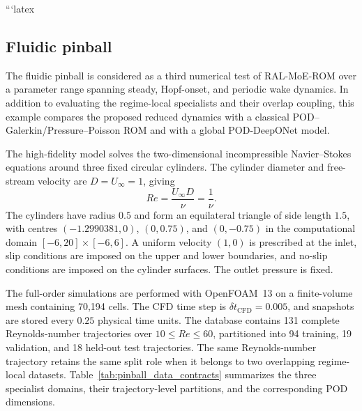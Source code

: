 
```latex
\subsection{Fluidic pinball}
\label{subsec:fluidic_pinball}

The fluidic pinball is considered as a third numerical test of RAL-MoE-ROM
over a parameter range spanning steady, Hopf-onset, and periodic wake
dynamics. In addition to evaluating the regime-local specialists and their
overlap coupling, this example compares the proposed reduced dynamics with a
classical POD--Galerkin/Pressure--Poisson ROM\cite{holmes1996turbulence} and with a global
POD-DeepONet model\cite{lu2021learning}. 

The high-fidelity model solves the two-dimensional incompressible
Navier--Stokes equations around three fixed circular cylinders. The cylinder
diameter and free-stream velocity are $D=U_\infty=1$, giving
\[
Re=\frac{U_\infty D}{\nu}=\frac{1}{\nu}.
\]
The cylinders have radius $0.5$ and form an equilateral triangle of side
length $1.5$, with centres
$(-1.2990381,0)$, $(0,0.75)$, and $(0,-0.75)$ in the computational domain
$[-6,20]\times[-6,6]$. A uniform velocity $(1,0)$ is prescribed at the
inlet, slip conditions are imposed on the upper and lower boundaries, and
no-slip conditions are imposed on the cylinder surfaces. The outlet
pressure is fixed.

The full-order simulations are performed with OpenFOAM~13 on a
finite-volume mesh containing 70,194 cells. The CFD time step is
$\delta t_{\mathrm{CFD}}=0.005$, and snapshots are stored every $0.25$
physical time units. The database contains 131 complete Reynolds-number trajectories over
$10\le Re\le60$, partitioned into 94 training, 19 validation, and 18
held-out test trajectories. The same Reynolds-number trajectory retains the
same split role when it belongs to two overlapping regime-local datasets.
Table~\ref{tab:pinball_data_contracts} summarizes the three specialist
domains, their trajectory-level partitions, and the corresponding POD
dimensions. 

